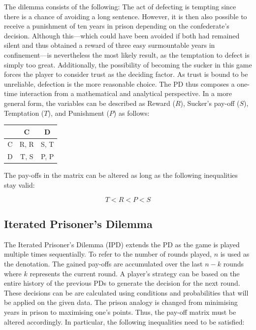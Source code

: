\documentclass[11pt]{article}
\begin{document}
\noindent
The dilemma consists of the following:
The act of defecting is tempting since there is a chance of avoiding a long sentence.
However, it is then also possible to receive a punishment of ten years in prison depending on the confederate's decision.
Although this---which could have been avoided if both had remained silent and thus obtained a reward of three easy surmountable years in confinement---is nevertheless the most likely result, as the temptation to defect is simply too great.
Additionally, the possibility of becoming the sucker in this game forces the player to consider trust as the deciding factor.
As trust is bound to be unreliable, defection is the more reasonable choice.
The PD thus composes a one-time interaction from a mathematical and analytical perspective. 
In a more general form, the variables can be described as Reward ($R$), Sucker's pay-off ($S$), Temptation ($T$), and Punishment ($P$) as follows:

\begin{center}
\begin{tabular}{ c|c|c }
   & C & D \\ 
   \hline
 C & R, R & S, T\\  
   \hline
 D & T, S & P, P
\end{tabular}
\end{center}

\noindent The pay-offs in the matrix can be altered as long as the following inequalities stay valid:

\begin{equation}
	T < R < P < S
	\label{eq:TRPS}
\end{equation}

\subsection{Iterated Prisoner's Dilemma}
		
The Iterated Prisoner's Dilemma (IPD) extends the PD as the game is played multiple times sequentially. 
To refer to the number of rounds played, $n$ is used as the denotation. 
The gained pay-offs are accumulated over the last $n-k$ rounds where $k$ represents the current round.
A player's strategy can be based on the entire history of the previous PDs to generate the decision for the next round.
These decisions can be are calculated using conditions and probabilities that will be applied on the given data.
The prison analogy is changed from minimising years in prison to maximising one's points.
Thus, the pay-off matrix must be altered accordingly.
In particular, the following inequalities need to be satisfied:
%
\end{document}
